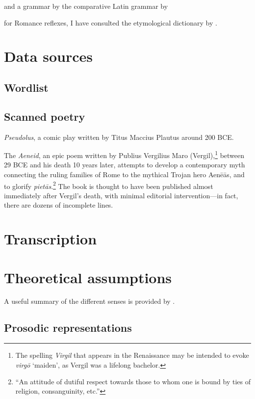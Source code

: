 and a grammar by \citet{Sommer1902}
the comparative Latin grammar by \citet{Sihler1995}

for Romance reflexes, I have consulted the etymological dictionary by \citet{Meyer-Lubke1935}.

\section{Data sources}

\subsection{Wordlist}

\subsection{Scanned poetry}

\emph{Pseudolus}, a comic play written by Titus Maccius Plautus around 200 BCE.

The \emph{Aeneid}, an epic poem written by Publius Vergilius Maro (Vergil),\footnote{
    The spelling \emph{Virgil} that appears in the Renaissance may be intended to evoke \emph{virgō} `maiden', as Vergil was a lifelong bachelor.}
between 29 BCE and his death 10 years later, attempts to develop a contemporary myth connecting the ruling families of Rome to the mythical Trojan hero Aenēās, and to glorify \emph{pietās}.\footnote{
    ``An attitude of dutiful respect towards those to whom one is bound by ties of religion, consanguinity, etc.'' }
The book is thought to have been published almost immediately after Vergil's death, with minimal editorial intervention---in fact, there are dozens of incomplete lines.

\section{Transcription}

\section{Theoretical assumptions}

\citet{SPE}
\citet{Halle1993}

A useful summary of the different senses is provided by \citet[chap.~1]{Blaho2008}.

\subsection{Prosodic representations}

